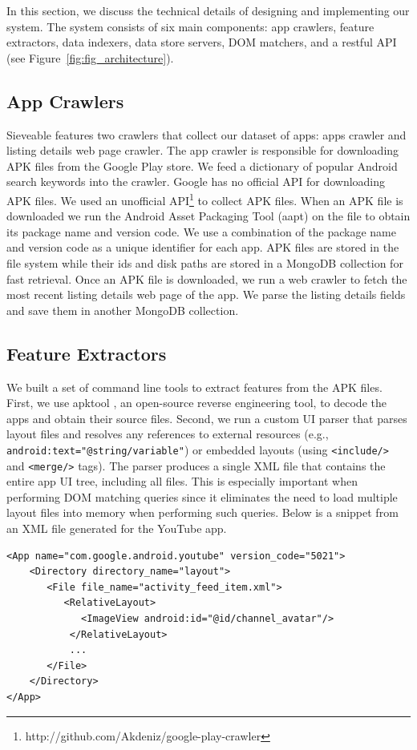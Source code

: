 In this section, we discuss the technical details of designing and implementing our system. The system consists of six main components: app crawlers, feature extractors, data indexers, data store servers, DOM matchers, and a restful API (see Figure~\ref{fig:fig_architecture}).

\subsection{App Crawlers}
Sieveable features two crawlers that collect our dataset of apps: apps crawler and listing details web page crawler.
The app crawler is responsible for downloading APK files from the Google Play store.
We feed a dictionary of popular Android search keywords into the crawler.
Google has no official API for downloading APK files.
We used an unofficial API\footnote{http://github.com/Akdeniz/google-play-crawler} to collect APK files.
When an APK file is downloaded we run the Android Asset Packaging Tool (aapt) on the file to obtain its package name and version code.
We use a combination of the package name and version code as a unique identifier for each app.
APK files are stored in the file system while their ids and disk paths are stored in a MongoDB collection for fast retrieval.
Once an APK file is downloaded, we run a web crawler to fetch the most recent listing details web page of the app.
We parse the listing details fields and save them in another MongoDB collection.

\subsection{Feature Extractors}
We built a set of command line tools to extract features from the APK files.
First, we use apktool \cite{apktool}, an open-source reverse engineering tool, to decode the apps and obtain their source files.
Second, we run a custom UI parser that parses layout files and resolves any references to external resources (e.g., \texttt{android:text="@string/variable"}) or embedded layouts (using \texttt{<include/>} and \texttt{<merge/>} tags).
The parser produces a single XML file that contains the entire app UI tree, including all files.
This is especially important when performing DOM matching queries since it eliminates the need to load multiple layout files into memory when performing such queries.
Below is a snippet from an XML file generated for the YouTube app.

\begin{verbatim}
<App name="com.google.android.youtube" version_code="5021">
    <Directory directory_name="layout">
       <File file_name="activity_feed_item.xml">
          <RelativeLayout>
             <ImageView android:id="@id/channel_avatar"/>
           </RelativeLayout>
           ...
       </File>
    </Directory>
</App>
\end{verbatim}


